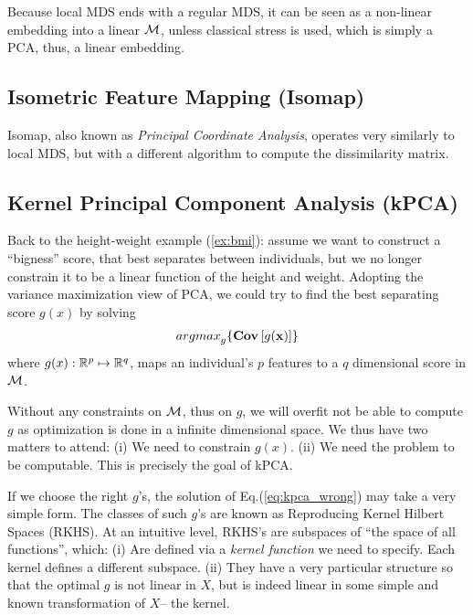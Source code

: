 \documentclass[12pt,a4paper]{article}
\begin{document}
Because local MDS ends with a regular MDS, it can be seen as a non-linear embedding into a linear $\mathcal{M}$, unless classical stress is used, which is simply a PCA, thus, a linear embedding. 





\subsection{Isometric Feature Mapping (Isomap)}
\label{sec:isomap}

Isomap, also known as \emph{Principal Coordinate Analysis}, operates very similarly to local MDS, but with a different algorithm to compute the dissimilarity matrix.



\subsection{Kernel Principal Component Analysis (kPCA)}
\label{sec:kpca}

Back to the height-weight example (\ref{ex:bmi}): assume we want to construct a ``bigness'' score, that best separates between individuals, but we no longer constrain it to be a linear function of the height and weight.
Adopting the variance maximization view of PCA, we could try to find the best separating score $g(x)$ by solving 
\begin{align}
\label{eq:kpca_wrong}
	\textstyle{\mathop{argmax}_{g}}\{ \mathbf{Cov} \left[ g(\mathbf{x}) \right] \}
\end{align}
where $g(x):\mathbb{R}^p \mapsto \mathbb{R}^q$, maps an individual's $p$ features to a $q$ dimensional score in $\mathcal{M}$.

Without any constraints on $\mathcal{M}$, thus on $g$, we will overfit \andor not be able to compute $g$ as optimization is done in a infinite dimensional space. 
We thus have two matters to attend:
(i) We need to constrain $g(x)$.
(ii) We need the problem to be computable.
This is precisely the goal of kPCA. 

If we choose the right $g$'s, the solution of Eq.(\ref{eq:kpca_wrong}) may take a very simple form. 
The classes of such $g$'s are known as Reproducing Kernel Hilbert Spaces (RKHS). 
At an intuitive level, RKHS's are subspaces of ``the space of all functions'', which:
(i) Are defined via a \emph{kernel function} we need to specify. Each kernel defines a different subspace. 
(ii) They have a very particular structure so that the optimal $g$ is not linear in $X$, but is indeed linear in some simple and known transformation of $X$-- the kernel. 
\end{document}
